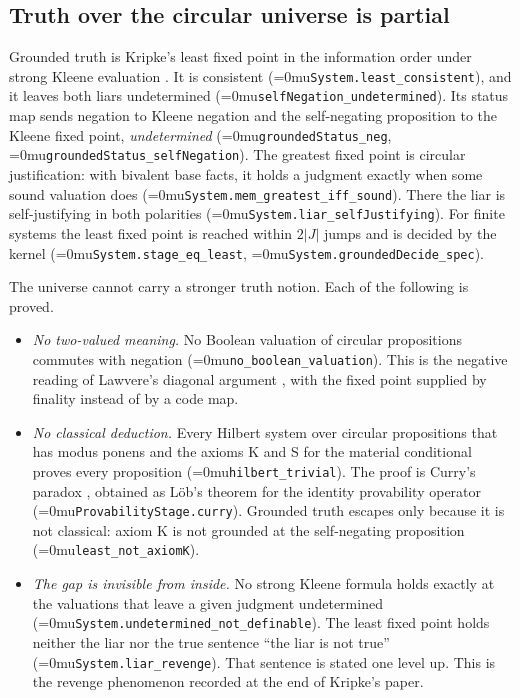 \documentclass[11pt]{article}
\newcommand{\leanname}[1]{\textup{\Urlmuskip=0mu\relax\nolinkurl{#1}}}
\theoremstyle{definition}
\theoremstyle{remark}
\begin{document}
\subsection{Truth over the circular universe is partial}
\label{sec:circular-truth}

Grounded truth is Kripke's least fixed point in the information order under
strong Kleene evaluation \cite{KripkeTruth,FittingKripkeKleene}.  It is
consistent (\leanname{System.least_consistent}), and it leaves both liars
undetermined (\leanname{selfNegation_undetermined}).  Its status map sends
negation to Kleene negation and the self-negating proposition to the Kleene
fixed point, \emph{undetermined} (\leanname{groundedStatus_neg},
\leanname{groundedStatus_selfNegation}).  The greatest fixed point is circular
justification: with bivalent base facts, it holds a judgment exactly when some
sound valuation does (\leanname{System.mem_greatest_iff_sound}).  There the liar is
self-justifying in both polarities (\leanname{System.liar_selfJustifying}).  For finite
systems the least fixed point is reached within $2|J|$ jumps and is decided by
the kernel (\leanname{System.stage_eq_least}, \leanname{System.groundedDecide_spec}).

The universe cannot carry a stronger truth notion.  Each of the following is
proved.
\begin{itemize}[leftmargin=*]
\item \emph{No two-valued meaning.}  No Boolean valuation of circular
  propositions commutes with negation (\leanname{no_boolean_valuation}).  This
  is the negative reading of Lawvere's diagonal argument
  \cite{LawvereDiagonal}, with the fixed point supplied by finality instead of
  by a code map.
\item \emph{No classical deduction.}  Every Hilbert system over circular
  propositions that has modus ponens and the axioms K and S for the material
  conditional proves every proposition (\leanname{hilbert_trivial}).  The
  proof is Curry's paradox \cite{CurryInconsistency}, obtained as L\"ob's
  theorem for the identity provability operator
  (\leanname{ProvabilityStage.curry}).  Grounded truth escapes only because it
  is not classical: axiom K is not grounded at the self-negating proposition
  (\leanname{least_not_axiomK}).
\item \emph{The gap is invisible from inside.}  No strong Kleene formula holds
  exactly at the valuations that leave a given judgment undetermined
  (\leanname{System.undetermined_not_definable}).  The least fixed point holds neither
  the liar nor the true sentence ``the liar is not true''
  (\leanname{System.liar_revenge}).  That sentence is stated one level up.  This is
  the revenge phenomenon recorded at the end of Kripke's paper.
\end{itemize}
\end{document}
